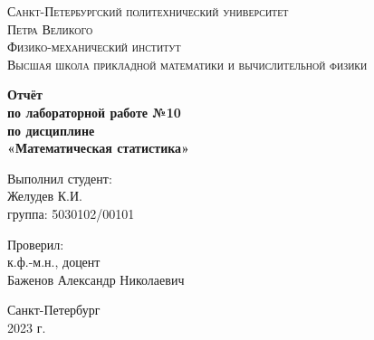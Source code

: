 \begin{titlepage}
	\begin{center}
		\textsc{Санкт-Петербургский политехнический университет\\Петра Великого\\[5mm]
			Физико-механический институт\\[2mm]
			Высшая школа прикладной математики и вычислительной физики}
		
		\vfill
		
		\textbf{Отчёт\\по лабораторной работе №10\\по дисциплине\\ «Математическая статистика»
			\\[26mm]}
	\end{center}

	\begin{flushright}
		Выполнил студент: \\
		Желудев К.И. \\
		группа: 5030102/00101 \\
	\end{flushright}
	
	\begin{flushright}
		Проверил: \\
		к.ф.-м.н., доцент \\
		Баженов Александр Николаевич \\
	\end{flushright}
	
	\vspace*{\fill}
	\begin{center}
		Санкт-Петербург\\2023 г.
	\end{center}
\end{titlepage}
